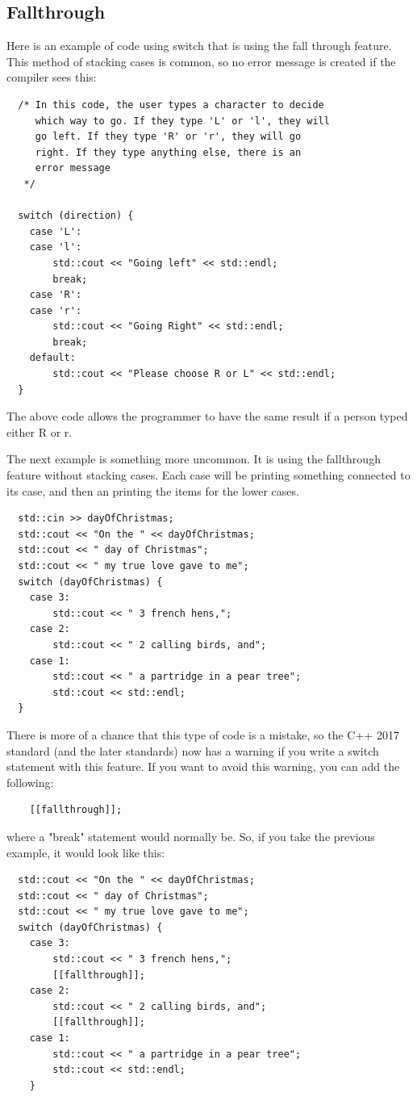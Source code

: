 \subsection{Fallthrough}
Here is an example of code using switch that is using the fall through feature. This method of stacking cases is common, so no error message is created if the compiler sees this:
\begin{lstlisting}
  /* In this code, the user types a character to decide 
     which way to go. If they type 'L' or 'l', they will 
     go left. If they type 'R' or 'r', they will go 
     right. If they type anything else, there is an 
     error message
   */
   
  switch (direction) {
    case 'L':
    case 'l':
        std::cout << "Going left" << std::endl;
        break;
    case 'R':
    case 'r':
        std::cout << "Going Right" << std::endl;
        break;    
    default:
        std::cout << "Please choose R or L" << std::endl;
  }
\end{lstlisting}
The above code allows the programmer to have the same result if 
a person typed either R or r. 

The next example is something more uncommon. It is using the fallthrough feature without stacking cases. Each case will be
printing something connected to its case, and then an printing the items for the lower cases.

\begin{lstlisting}
  std::cin >> dayOfChristmas;
  std::cout << "On the " << dayOfChristmas;
  std::cout << " day of Christmas";
  std::cout << " my true love gave to me";
  switch (dayOfChristmas) {
    case 3:
        std::cout << " 3 french hens,";
    case 2:
        std::cout << " 2 calling birds, and";
    case 1:
        std::cout << " a partridge in a pear tree";
        std::cout << std::endl;
  }
\end{lstlisting}

There is more of a chance that this type of code is a mistake, so the C++ 2017 standard (and the later standards) now has a warning if you write a switch statement with this feature. If you want to avoid this warning, you can add the following:
\begin{verbatim}
    [[fallthrough]];    
\end{verbatim}
where a "break" statement would normally be. So, if you take the previous example, it would look like this:
\begin{lstlisting}
  std::cout << "On the " << dayOfChristmas;
  std::cout << " day of Christmas";
  std::cout << " my true love gave to me";
  switch (dayOfChristmas) {
    case 3:
        std::cout << " 3 french hens,";
        [[fallthrough]];
    case 2:
        std::cout << " 2 calling birds, and";
        [[fallthrough]];
    case 1:
        std::cout << " a partridge in a pear tree";
        std::cout << std::endl;
    }
\end{lstlisting}

